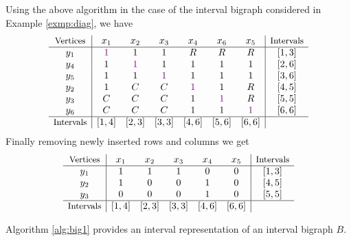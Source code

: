 \documentclass[secthm]{elsart}
\begin{document}
Using the above algorithm in the case of the interval bigraph considered in Example \ref{exmp:diag}, we have
$$\begin{array}{c|cccccc|c}
\textrm{\small Vertices} & x_1 & x_2 & x_3 & x_4 & x_6 & x_5 & \textrm{\small Intervals}\\
\hline
y_1 & \textcolor{darkmagenta}{1} & 1 & 1 & R & R & R & [1,3]\\
y_4 & 1 & \textcolor{darkmagenta}{1} & 1 & 1 & 1 & 1 & [2,6]\\
y_5 & 1 & 1 & \textcolor{darkmagenta}{1} & 1 & 1 & 1 & [3,6]\\
y_2 & 1 & C & C & \textcolor{darkmagenta}{1} & 1 & R & [4,5]\\
y_3 & C & C & C & 1 & \textcolor{darkmagenta}{1} & R & [5,5]\\
y_6 & C & C & C & 1 & 1 & \textcolor{darkmagenta}{1} & [6,6]\\
\hline
\textrm{\small Intervals} & [1,4] & [2,3] & [3,3] & [4,6] & [5,6] & [6,6] &
\end{array}$$
Finally removing newly inserted rows and columns we get
$$\begin{array}{c|ccccc|c}
\textrm{\small Vertices} & x_1 & x_2 & x_3 & x_4 & x_5 & \textrm{\small Intervals}\\
\hline
y_1 & 1 & 1 & 1 & 0 & 0 & [1,3]\\
y_2 & 1 & 0 & 0 & 1 & 0 & [4,5]\\
y_3 & 0 & 0 & 0 & 1 & 0 & [5,5]\\
\hline
\textrm{\small Intervals} & [1,4] & [2,3] & [3,3] & [4,6] & [6,6] &
\end{array}$$

\begin{prop}
Algorithm \ref{alg:big1} provides an interval representation of an interval bigraph $B$.
\end{prop} 
\end{document}
